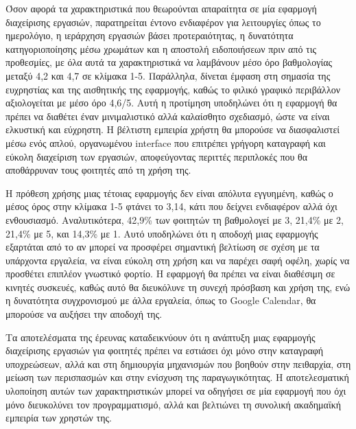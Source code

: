             Όσον αφορά τα χαρακτηριστικά που θεωρούνται απαραίτητα σε μία εφαρμογή διαχείρισης εργασιών, παρατηρείται έντονο ενδιαφέρον για λειτουργίες όπως το ημερολόγιο, η ιεράρχηση εργασιών βάσει προτεραιότητας, η δυνατότητα κατηγοριοποίησης μέσω χρωμάτων και η αποστολή ειδοποιήσεων πριν από τις προθεσμίες, με όλα αυτά τα χαρακτηριστικά να λαμβάνουν μέσο όρο βαθμολογίας μεταξύ 4,2 και 4,7 σε κλίμακα 1-5. Παράλληλα, δίνεται έμφαση στη σημασία της ευχρηστίας και της αισθητικής της εφαρμογής, καθώς το φιλικό γραφικό περιβάλλον αξιολογείται με μέσο όρο 4,6/5. Αυτή η προτίμηση υποδηλώνει ότι η εφαρμογή θα πρέπει να διαθέτει έναν μινιμαλιστικό αλλά καλαίσθητο σχεδιασμό, ώστε να είναι ελκυστική και εύχρηστη. Η βέλτιστη εμπειρία χρήστη θα μπορούσε να διασφαλιστεί μέσω ενός απλού, οργανωμένου interface που επιτρέπει γρήγορη καταγραφή και εύκολη διαχείριση των εργασιών, αποφεύγοντας περιττές περιπλοκές που θα αποθάρρυναν τους φοιτητές από τη χρήση της.

            Η πρόθεση χρήσης μιας τέτοιας εφαρμογής δεν είναι απόλυτα εγγυημένη, καθώς ο μέσος όρος στην κλίμακα 1-5 φτάνει το 3,14, κάτι που δείχνει ενδιαφέρον αλλά όχι ενθουσιασμό. Αναλυτικότερα, 42,9\% των φοιτητών τη βαθμολογεί με 3, 21,4\% με 2, 21,4\% με 5, και 14,3\% με 1. Αυτό υποδηλώνει ότι η αποδοχή μιας εφαρμογής εξαρτάται από το αν μπορεί να προσφέρει σημαντική βελτίωση σε σχέση με τα υπάρχοντα εργαλεία, να είναι εύκολη στη χρήση και να παρέχει σαφή οφέλη, χωρίς να προσθέτει επιπλέον γνωστικό φορτίο. Η εφαρμογή θα πρέπει να είναι διαθέσιμη σε κινητές συσκευές, καθώς αυτό θα διευκόλυνε τη συνεχή πρόσβαση και χρήση της, ενώ η δυνατότητα συγχρονισμού με άλλα εργαλεία, όπως το Google Calendar, θα μπορούσε να αυξήσει την αποδοχή της.

            Τα αποτελέσματα της έρευνας καταδεικνύουν ότι η ανάπτυξη μιας εφαρμογής διαχείρισης εργασιών για φοιτητές πρέπει να εστιάσει όχι μόνο στην καταγραφή υποχρεώσεων, αλλά και στη δημιουργία μηχανισμών που βοηθούν στην πειθαρχία, στη μείωση των περισπασμών και στην ενίσχυση της παραγωγικότητας. Η αποτελεσματική υλοποίηση αυτών των χαρακτηριστικών μπορεί να οδηγήσει σε μία εφαρμογή που όχι μόνο διευκολύνει τον προγραμματισμό, αλλά και βελτιώνει τη συνολική ακαδημαϊκή εμπειρία των χρηστών της.